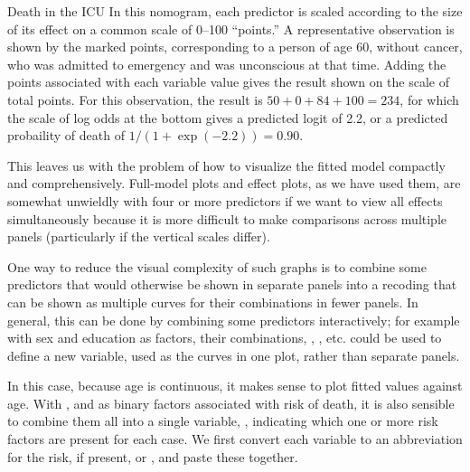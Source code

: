 \documentclass[11pt]{book}\usepackage[]{graphicx}\usepackage[]{color}
\begin{document}
\begin{Example}[icu1]{Death in the ICU}
In this nomogram, each predictor is scaled according to the size of its effect on a common scale
of 0--100 ``points.''  A representative observation is shown by the marked points, 
corresponding to a person of age 60, without cancer, who was admitted to emergency
and was unconscious at that time.  Adding the points associated with each variable
value gives the result shown on the scale of total points.
For this observation, the result is $50 + 0 + 84 +100 = 234$, for which the
scale of log odds at the bottom gives a predicted logit of 2.2, or a predicted 
probaility of death of $1/(1+\exp({-2.2}))= 0.90$.

This leaves us with the problem of how to visualize the fitted model compactly
and comprehensively.   Full-model plots and effect plots, as we have used them,
are somewhat unwieldly with four or more predictors if we want to view all
effects simultaneously because it is more difficult to make comparisons
across multiple panels (particularly if the vertical scales differ).

One way to reduce the visual complexity of such graphs is to combine some predictors
that would otherwise be shown in separate panels into a recoding that can be
shown as multiple curves for their combinations in fewer panels.  In general,
this can be done by combining some predictors interactively; for example
with sex and education as factors, their combinations, , ,
etc. could be used to define a new variable,  used as the curves
in one plot, rather than separate panels.

In this case, because age is continuous, it makes sense to plot fitted values
against age.  With ,   and   as binary
factors associated with risk of death, it is also sensible to combine them
all into a single variable, , indicating which one or more
risk factors are present for each case.  We first convert each variable
to an abbreviation for the risk, if present, or , and paste
these together.


\end{Example}
\end{document}
